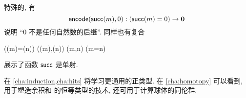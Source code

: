 特殊的, 有
\begin{equation}\label{eq:zero-not-succ}
  \encode(\suc(m),0) : (\suc(m)=0) \to \emptyt
\end{equation}
说明 ``$0$ 不是任何自然数的后继''.
同样也有复合
\begin{narrowmultline}\label{eq:suc-injective}
  (\suc(m)=\suc(n))
  \xrightarrow{\encode} \narrowbreak
  \code(\suc(m),\suc(n))
  \jdeq \code(m,n) \xrightarrow{\decode} (m=n)
\end{narrowmultline}
展示了函数 $\mathsf{succ}$ 是单射.
%

在 \cref{cha:induction,cha:hits} 将学习更通用的正类型.
在 \cref{cha:homotopy} 可以看到, 用于塑造余积和 \nat 的恒等类型的技术, 还可用于计算球体的同伦群.

%
%